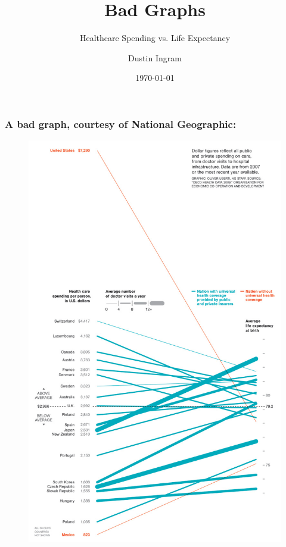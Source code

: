 \documentclass{beamer}
\title{Bad Graphs}
\subtitle{Healthcare Spending vs. Life Expectancy}
\author{Dustin Ingram}
\institute{STAT601, Summer 12-13\\ Drexel University}
\date{\today}
\begin{document}
\maketitle

\begin{frame}
    \frametitle{A bad graph, courtesy of National Geographic:}
    \begin{figure}
        \centering
        \includegraphics[height=0.8\paperheight]{original.jpg}
    \end{figure}
\end{frame}
\end{document}
